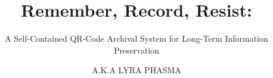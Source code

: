 \documentclass[12pt]{thesis} %
\title{Remember, Record, Resist:}     %
\subtitle{A Self-Contained QR-Code Archival System for Long-Term Information Preservation}
\author{A.K.A LYRA PHASMA}                           %
\begin{document}



\begin{romanpages}          %
\maketitle                  %
\tableofcontents            %
\listoffigures              %
\listoftables				%
\end{romanpages}            %

% 
% 







\appendix

% 

% 

% 

\printbibliography

\appendix
\end{document}
